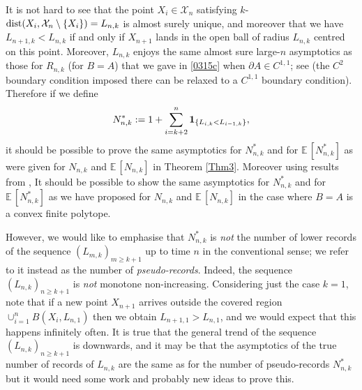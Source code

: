 \documentclass[12pt]{article}
\newcommand{\X}{\mathcal{X}}
\newcommand{\E}{\mathbb E \,}
\newcommand{\dist}{{\rm dist}}
\begin{document}
It is not hard to see that the point $X_i \in \X_n$ satisfying
$k$-$\dist(X_i, \X_n \setminus \{X_i\})= L_{n,k}$ is almost surely unique,
and moreover that we have $L_{n+1,k} < L_{n,k}$ if and only if
$X_{n+1}$ lands in the open ball of radius $L_{n,k}$ centred on this point. 
Moreover,  $L_{n,k}$ enjoys the same almost sure large-$n$ asymptotics 
as those for  $R_{n,k}$ (for $B=A$) that we gave in
\eqref{0315c} when $\partial A \in C^{1,1}$; see \cite{LNNL}
(the $C^2$ boundary condition imposed there can be relaxed to a 
$C^{1,1}$ boundary condition). Therefore if we define
$$
N^*_{n,k} := 1 + \sum_{i=k+2}^n {\bf 1}_{\{L_{i,k} < L_{i-1,k}\}},
$$
it should be possible to prove the same asymptotics for
$N_{n,k}^*$ and for $\E[N^*_{n,k}]$ as were given for
$N_{n,k}$ and $\E[N_{n,k}]$
in Theorem \ref{Thm3}. Moreover using results from
\cite{Poly}, It should be possible to show the same asymptotics
for 
$N_{n,k}^*$ and for $\E[N^*_{n,k}]$ as we have proposed for
$N_{n,k}$ and $\E[N_{n,k}]$ in the case where $B=A$ is a
convex finite polytope.

However, we would like to emphasise that $N^*_{n,k}$ is {\em not}
the number of lower records of the sequence $(L_{m,k})_{m \geq k+1}$
up to time $n$
in the conventional sense; we refer to it instead as
the number of {\em pseudo-records}.
Indeed, the sequence $(L_{n,k})_{n \geq k+1}$
is {\em not} monotone non-increasing. Considering just the case $k=1$,
note that if a new point
$X_{n+1}$ arrives outside the covered region $\cup_{i=1}^n B(X_i,L_{n,1})$
then we obtain $L_{n+1,1} > L_{n,1}$, and we would expect that this happens
infinitely often.
It is true that the general
trend of the sequence $(L_{n,k})_{n \geq k+1}$ is downwards, and it
may be that the asymptotics of the true number of records of $L_{n,k}$
are the same as for the number of pseudo-records
$N^*_{n,k}$ but it would need some work and
probably new ideas to
prove this.
\end{document}
